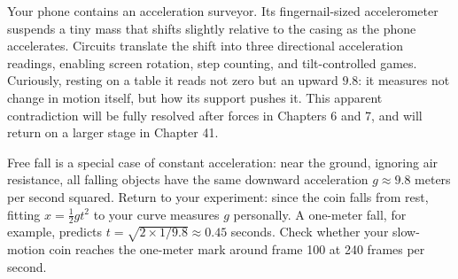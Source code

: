 \begin{mainline}
Your phone contains an acceleration surveyor. Its fingernail-sized accelerometer suspends a tiny mass that shifts slightly relative to the casing as the phone accelerates. Circuits translate the shift into three directional acceleration readings, enabling screen rotation, step counting, and tilt-controlled games. Curiously, resting on a table it reads not zero but an upward \(9.8\): it measures not change in motion itself, but how its support pushes it. This apparent contradiction will be fully resolved after forces in Chapters 6 and 7, and will return on a larger stage in Chapter 41.

Free fall is a special case of constant acceleration: near the ground, ignoring air resistance, all falling objects have the same downward acceleration \(g\approx 9.8\) meters per second squared. Return to your experiment: since the coin falls from rest, fitting \(x=\tfrac12 g t^2\) to your curve measures \(g\) personally. A one-meter fall, for example, predicts \(t=\sqrt{2\times1/9.8}\approx 0.45\) seconds. Check whether your slow-motion coin reaches the one-meter mark around frame 100 at 240 frames per second.
\end{mainline}

